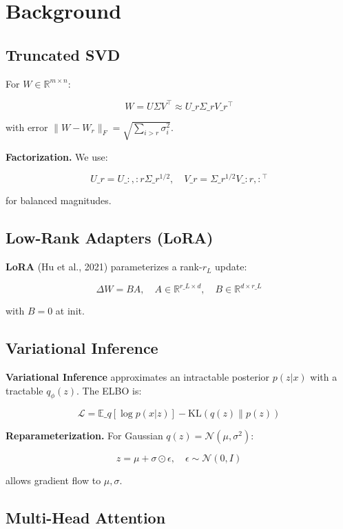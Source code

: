 \section{Background}

\subsection{Truncated SVD}

For $W \in \mathbb{R}^{m \times n}$:

\[
W = U \Sigma V^\top \approx U\_r \Sigma\_r V\_r^\top
\tag{3.1}
\]

with error $\|W - W_r\|_F = \sqrt{\sum_{i > r} \sigma_i^2}$.

\textbf{Factorization.} We use:

\[
U\_r = U\_{:, :r} \Sigma\_r^{1/2}, \quad V\_r = \Sigma\_r^{1/2} V\_{:r, :}^\top
\tag{3.2}
\]

for balanced magnitudes.

\subsection{Low-Rank Adapters (LoRA)}

\textbf{LoRA} (Hu et al., 2021) parameterizes a rank-$r_L$ update:

\[
\Delta W = B A, \quad A \in \mathbb{R}^{r\_L \times d}, \quad B \in \mathbb{R}^{d \times r\_L}
\tag{3.3}
\]

with $B = 0$ at init.

\subsection{Variational Inference}

\textbf{Variational Inference} approximates an intractable posterior $p(z | x)$ 
with a tractable $q_\phi(z)$. The ELBO is:

\[
\mathcal{L} = \mathbb{E}\_{q}[\log p(x | z)] - \text{KL}(q(z) \| p(z))
\tag{3.4}
\]

\textbf{Reparameterization.} For Gaussian $q(z) = \mathcal{N}(\mu, \sigma^2)$:

\[
z = \mu + \sigma \odot \epsilon, \quad \epsilon \sim \mathcal{N}(0, I)
\tag{3.5}
\]

allows gradient flow to $\mu, \sigma$.

\subsection{Multi-Head Attention}

